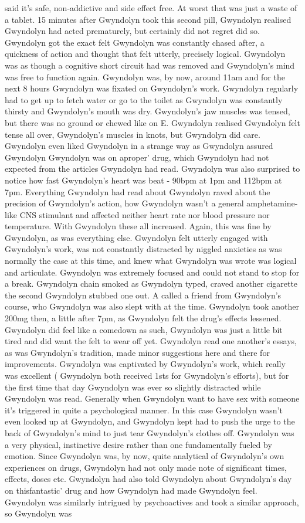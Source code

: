 \documentclass[12pt]{book}
\begin{document}
said it's safe, non-addictive and side effect free. At worst that was just a waste of a tablet. 15 minutes after Gwyndolyn took this second pill, Gwyndolyn realised Gwyndolyn had acted prematurely, but certainly did not regret did so. Gwyndolyn got the exact felt Gwyndolyn was constantly chased after, a quickness of action and thought that felt utterly, precisely logical. Gwyndolyn was as though a cognitive short circuit had was removed and Gwyndolyn's mind was free to function again. Gwyndolyn was, by now, around 11am and for the next 8 hours Gwyndolyn was fixated on Gwyndolyn's work. Gwyndolyn regularly had to get up to fetch water or go to the toilet as Gwyndolyn was constantly thirsty and Gwyndolyn's mouth was dry. Gwyndolyn's jaw muscles was tensed, but there was no ground or chewed like on E. Gwyndolyn realised Gwyndolyn felt tense all over, Gwyndolyn's muscles in knots, but Gwyndolyn did care. Gwyndolyn even liked Gwyndolyn in a strange way as Gwyndolyn assured Gwyndolyn Gwyndolyn was on aproper' drug, which Gwyndolyn had not expected from the articles Gwyndolyn had read. Gwyndolyn was also surprised to notice how fast Gwyndolyn's heart was beat - 90bpm at 1pm and 112bpm at 7pm. Everything Gwyndolyn had read about Gwyndolyn raved about the precision of Gwyndolyn's action, how Gwyndolyn wasn't a general amphetamine-like CNS stimulant and affected neither heart rate nor blood pressure nor temperature. With Gwyndolyn these all increased. Again, this was fine by Gwyndolyn, as was everything else. Gwyndolyn felt utterly engaged with Gwyndolyn's work, was not constantly distracted by niggled anxieties as was normally the case at this time, and knew what Gwyndolyn was wrote was logical and articulate. Gwyndolyn was extremely focused and could not stand to stop for a break. Gwyndolyn chain smoked as Gwyndolyn typed, craved another cigarette the second Gwyndolyn stubbed one out. A called a friend from Gwyndolyn's course, who Gwyndolyn was also slept with at the time. Gwyndolyn took another 200mg then, a little after 7pm, as Gwyndolyn felt the drug's effects lessened. Gwyndolyn did feel like a comedown as such, Gwyndolyn was just a little bit tired and did want the felt to wear off yet. Gwyndolyn read one another's essays, as was Gwyndolyn's tradition, made minor suggestions here and there for improvements. Gwyndolyn was captivated by Gwyndolyn's work, which really was excellent ( Gwyndolyn both received 1sts for Gwyndolyn's efforts), but for the first time that day Gwyndolyn was ever so slightly distracted while Gwyndolyn was read. Generally when Gwyndolyn want to have sex with someone it's triggered in quite a psychological manner. In this case Gwyndolyn wasn't even looked up at Gwyndolyn, and Gwyndolyn kept had to push the urge to the back of Gwyndolyn's mind to just tear Gwyndolyn's clothes off. Gwyndolyn was a very physical, instinctive desire rather than one fundamentally fueled by emotion. Since Gwyndolyn was, by now, quite analytical of Gwyndolyn's own experiences on drugs, Gwyndolyn had not only made note of significant times, effects, doses etc. Gwyndolyn had also told Gwyndolyn about Gwyndolyn's day on thisfantastic' drug and how Gwyndolyn had made Gwyndolyn feel. Gwyndolyn was similarly intrigued by psychoactives and took a similar approach, so Gwyndolyn was 
\end{document}
